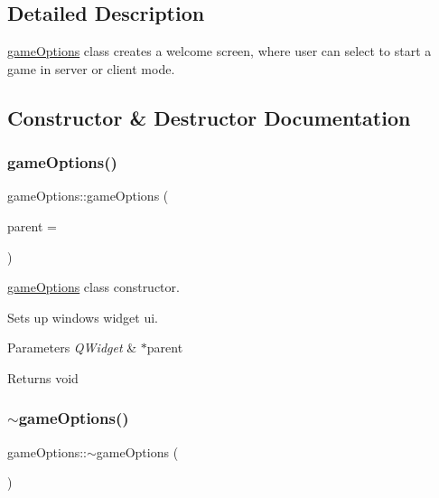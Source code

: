 \subsection{Detailed Description}
\mbox{\hyperlink{classgame_options}{game\+Options}} class creates a welcome screen, where user can select to start a game in server or client mode. 

\subsection{Constructor \& Destructor Documentation}
\mbox{\label{classgame_options_a2ebd15d680a6cadd61e9cec3d8968677}} 
\subsubsection{\texorpdfstring{game\+Options()}{gameOptions()}}
{\footnotesize\ttfamily game\+Options\+::game\+Options (\begin{DoxyParamCaption}\item[{Q\+Widget $\ast$}]{parent = {} }\end{DoxyParamCaption})\hspace{0.3cm}{\ttfamily [explicit]}}



\mbox{\hyperlink{classgame_options}{game\+Options}} class constructor. 

Sets up windows widget ui. 
\begin{DoxyParams}{Parameters}
{\em Q\+Widget} & $\ast$parent \\
\hline
\end{DoxyParams}
\begin{DoxyReturn}{Returns}
void 
\end{DoxyReturn}
\mbox{\label{classgame_options_ae0f5375ed0aa7e83890ae42ee4b512c3}} 
\subsubsection{\texorpdfstring{$\sim$game\+Options()}{~gameOptions()}}
{\footnotesize\ttfamily game\+Options\+::$\sim$game\+Options (\begin{DoxyParamCaption}{ }\end{DoxyParamCaption})}



